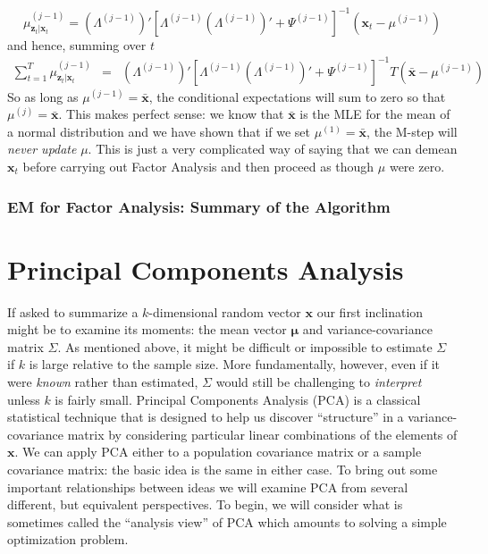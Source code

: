 \documentclass[12pt]{article}
\theoremstyle{definition}
\begin{document}
	$$\mu^{(j-1)}_{\mathbf{z}_t|\mathbf{x}_t} = \left(\Lambda^{(j-1)}\right)' \left[\Lambda^{(j-1)} \left(\Lambda^{(j-1)}\right)' + \Psi^{(j-1)}\right]^{-1} \left(\mathbf{x}_t - \mu^{(j-1)}\right)$$
and hence, summing over $t$
	\begin{eqnarray*}
		\sum_{t = 1}^T \mu^{(j-1)}_{\mathbf{z}_t|\mathbf{x}_t} &=& \left(\Lambda^{(j-1)}\right)' \left[\Lambda^{(j-1)} \left(\Lambda^{(j-1)}\right)' + \Psi^{(j-1)}\right]^{-1} T\left(\bar{\mathbf{x}} - \mu^{(j-1)} \right)
 	\end{eqnarray*}
So as long as $\mu^{(j-1)} = \bar{\mathbf{x}}$, the conditional expectations will sum to zero so that $\mu^{(j)} = \bar{\mathbf{x}}$. This makes perfect sense: we know that $\bar{\mathbf{x}}$ is the MLE for the mean of a normal distribution and we have shown that if we set $\mu^{(1)} = \bar{\mathbf{x}}$, the M-step will \emph{never update} $\mu$. This is just a very complicated way of saying that we can demean $\mathbf{x}_t$ before carrying out Factor Analysis and then proceed as though $\mu$ were zero. 

\subsubsection{EM for Factor Analysis: Summary of the Algorithm}



\section{Principal Components Analysis}
If asked to summarize a $k$-dimensional random vector $\mathbf{x}$ our first inclination might be to examine its moments: the mean vector $\boldsymbol{\mu}$ and variance-covariance matrix $\Sigma$. As mentioned above, it might be difficult or impossible to estimate $\Sigma$ if $k$ is large relative to the sample size. More fundamentally, however, even if it were \emph{known} rather than estimated, $\Sigma$ would still be challenging to \emph{interpret} unless $k$ is fairly small. Principal Components Analysis (PCA) is a classical statistical technique that is designed to help us discover ``structure'' in a variance-covariance matrix by considering particular linear combinations of the elements of $\mathbf{x}$. We can apply PCA either to a population covariance matrix or a sample covariance matrix: the basic idea is the same in either case. To bring out some important relationships between ideas we will examine PCA from several different, but equivalent perspectives. To begin, we will consider what is sometimes called the ``analysis view'' of PCA which amounts to solving a simple optimization problem. 
\end{document}
